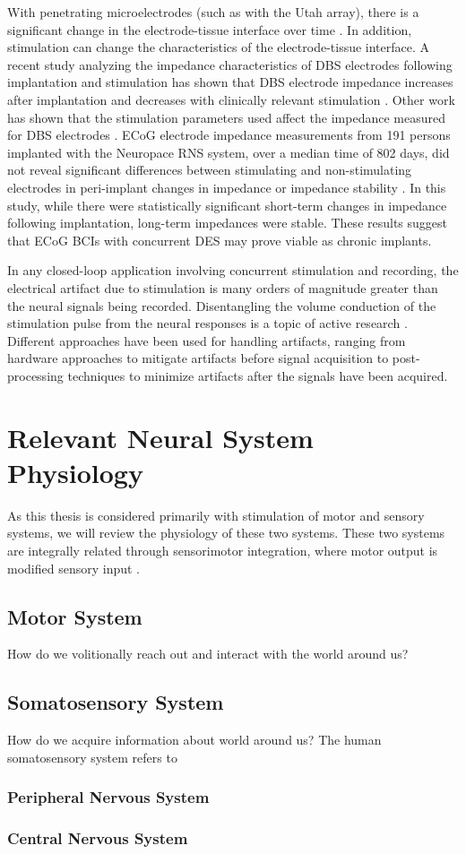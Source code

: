 With penetrating microelectrodes (such as with the Utah array), there is a significant change in the electrode-tissue interface over time \cite{Williams2007}. In addition, stimulation can change the characteristics of the electrode-tissue interface. A recent study analyzing the impedance characteristics of DBS electrodes following implantation and stimulation has shown that DBS electrode impedance increases after implantation and decreases with clinically relevant stimulation \cite{Lempka2009}. Other work has shown that the stimulation parameters used affect the impedance measured for DBS electrodes \cite{Wei2009}. ECoG electrode impedance measurements from 191 persons implanted with the Neuropace RNS system, over a median time of 802 days, did not reveal significant differences between stimulating and non-stimulating electrodes in peri-implant changes in impedance or impedance stability \cite{Ryapolova-Webb2014}. In this study, while there were statistically significant short-term changes in impedance following implantation, long-term impedances were stable. These results suggest that ECoG BCIs with concurrent DES may prove viable as chronic implants. 

In any closed-loop application involving concurrent stimulation and recording, the electrical artifact due to stimulation is many orders of magnitude greater than the neural signals being recorded. Disentangling the volume conduction of the stimulation pulse from the neural responses is a topic of active research \cite{Zhou2018}. Different approaches have been used for handling artifacts, ranging from hardware approaches to mitigate artifacts before signal acquisition to post-processing techniques to minimize artifacts after the signals have been acquired. 

\section{Relevant Neural System Physiology}

As this thesis is considered primarily with stimulation of motor and sensory systems, we will review the physiology of these two systems. These two systems are integrally related through sensorimotor integration, where motor output is modified sensory input \cite{Ackerley2015}.

\subsection{Motor System}
How do we volitionally reach out and interact with the world around us?

\subsection{Somatosensory System}
How do we acquire information about world around us? The human somatosensory system refers to 

\subsubsection{Peripheral Nervous System}

\subsubsection{Central Nervous System}


